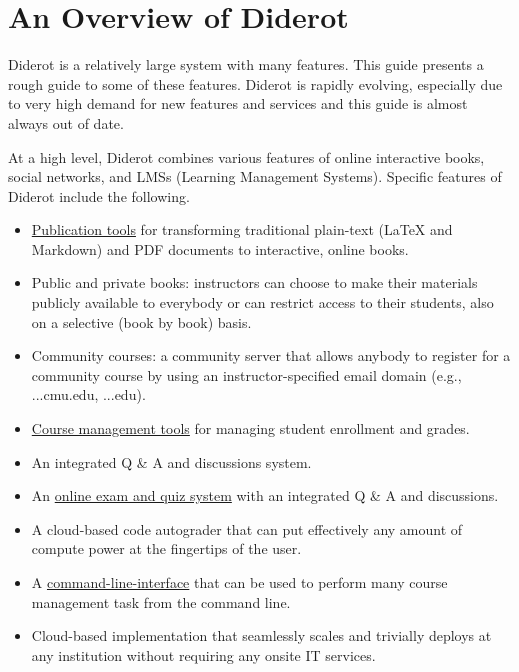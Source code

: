 \chapter{An Overview of Diderot}
\label{ch:overview}

Diderot is a relatively large system with many features. This guide presents a rough guide to some of these features.  Diderot is rapidly evolving, especially due to very high demand for new features and services and this guide is almost always out of date.

At a high level, Diderot combines various features of online interactive books,  social networks, and LMSs (Learning Management Systems).
% 
Specific features of Diderot include the following.

\begin{itemize}

\item  
\href{ch:dc}{Publication tools} 
%
for transforming traditional plain-text (LaTeX and Markdown) and PDF documents to interactive, online books. 

\item 
Public and private books: instructors can choose to make their materials publicly available to everybody or can restrict access to their students, also on a selective (book by book) basis.

\item Community courses: a community server that allows anybody to register for a community course by using an instructor-specified email domain (e.g., \@...cmu.edu, \@...edu).
 
\item \href{ch:lms}{Course management tools} for managing student enrollment and grades.

\item An integrated Q \& A and discussions system. 

\item An \href{ch:quiz}{online exam and quiz system} with an integrated Q \& A and discussions.  

\item  A cloud-based code autograder that can put effectively
  any amount of compute power at the fingertips of the user.

\item A \href{ch:cli}{command-line-interface} that can be used to perform many course management task from the command line.

\item
  Cloud-based implementation that seamlessly scales and trivially
  deploys at any institution without requiring any onsite IT services.
\end{itemize}
